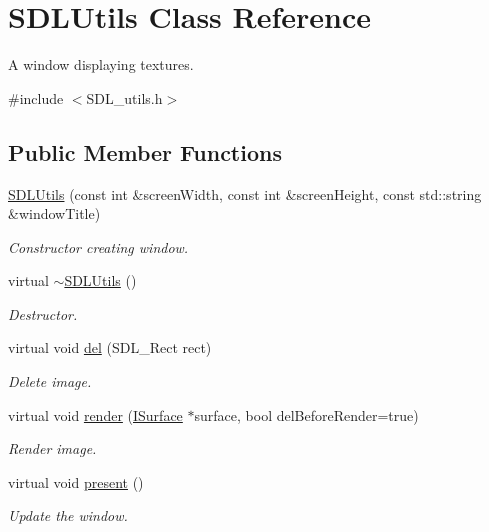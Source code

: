 \hypertarget{class_s_d_l_utils}{}\section{S\+D\+L\+Utils Class Reference}
\label{class_s_d_l_utils}


A window displaying textures.  




{\ttfamily \#include $<$S\+D\+L\+\_\+utils.\+h$>$}

\subsection*{Public Member Functions}
\begin{DoxyCompactItemize}
\item 
\mbox{\hyperlink{class_s_d_l_utils_a53e5b8a0018c3d96af3ad413b2272f3d}{S\+D\+L\+Utils}} (const int \&screen\+Width, const int \&screen\+Height, const std\+::string \&window\+Title)
\begin{DoxyCompactList}\small\item\em Constructor creating window. \end{DoxyCompactList}\item 
virtual \mbox{\hyperlink{class_s_d_l_utils_a4530f05f7fdf2495a63ff1e9fc553680}{$\sim$\+S\+D\+L\+Utils}} ()
\begin{DoxyCompactList}\small\item\em Destructor. \end{DoxyCompactList}\item 
virtual void \mbox{\hyperlink{class_s_d_l_utils_a8dfdc8f41938c2c53ac5121c10eb1638}{del}} (S\+D\+L\+\_\+\+Rect rect)
\begin{DoxyCompactList}\small\item\em Delete image. \end{DoxyCompactList}\item 
virtual void \mbox{\hyperlink{class_s_d_l_utils_aa13484f180cbea3441730382e108906c}{render}} (\mbox{\hyperlink{class_i_surface}{I\+Surface}} $\ast$surface, bool del\+Before\+Render=true)
\begin{DoxyCompactList}\small\item\em Render image. \end{DoxyCompactList}\item 
virtual void \mbox{\hyperlink{class_s_d_l_utils_a0e9c4b007ae61772a1c41592877b30ab}{present}} ()
\begin{DoxyCompactList}\small\item\em Update the window. \end{DoxyCompactList}\end{DoxyCompactItemize}


